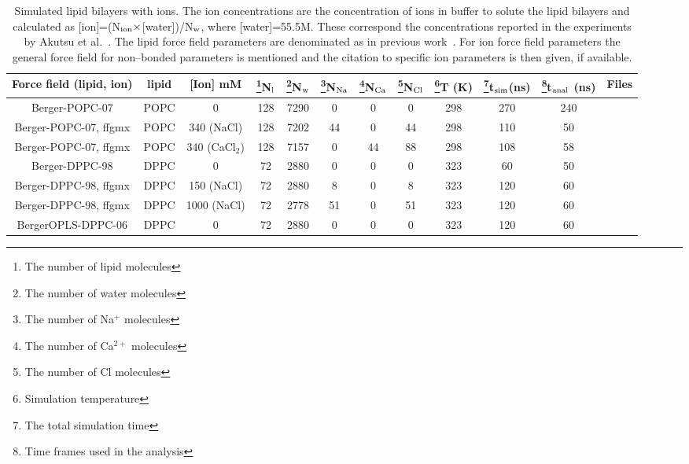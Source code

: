 \documentclass[pre,aps,floatfix,authordate1-4,twocolumn]{revtex4-1}
\begin{document}
\begin{table}[htb]
\centering
\caption{Simulated lipid bilayers with ions. The ion concentrations are the concentration of 
  ions in buffer to solute the lipid bilayers and calculated as [ion]=(N$_{\rm ion} \times$[water])/N$_{\rm w}$, 
  where [water]=55.5M. These correspond the concentrations reported in the experiments by Akutsu et al.~\cite{akutsu81}.
  The lipid force field parameters are denominated as in previous work~\cite{botan15}.
  For ion force field parameters the general force field for non--bonded parameters is mentioned and the citation to specific
  ion parameters is then given, if available.}\label{IONsystems}
\begin{tabular}{c c c c c c c c c c c c}
  Force field (lipid, ion)& lipid & [Ion] mM & \footnote{The number of lipid molecules}N$_{\rm l}$   &  \footnote{The number of water molecules}N$_{\rm w}$   & \footnote{The number of Na$^+$ molecules}N$_{\rm Na}$  & \footnote{The number of Ca$^{2+}$ molecules}N$_{\rm Ca}$   &  \footnote{The number of Cl molecules}N$_{\rm Cl}$ & \footnote{Simulation temperature}T (K)  & \footnote{The total simulation time}t$_{{\rm sim}}$(ns) & \footnote{Time frames used in the analysis}t$_{{\rm anal}}$ (ns) & Files\\
  \hline
  Berger-POPC-07\cite{ollila07a}   &   POPC & 0          & 128 & 7290 & 0  & 0  & 0 & 298  & 270 & 240 & \cite{bergerFILESpopc}  \\
  Berger-POPC-07\cite{ollila07a}, ffgmx\cite{straatsma88}  &   POPC & 340 (NaCl) & 128 & 7202 & 44  & 0  & 44 &298  & 110 & 50 & \cite{bergerPOPC340mMNaClfiles} \\
  Berger-POPC-07\cite{ollila07a}, ffgmx\cite{straatsma88}  &   POPC & 340 (CaCl$_2$) & 128 & 7157 & 0 & 44  & 88 &298 & 108 & 58 &\cite{bergerPOPC340mMCaClfiles}  \\
  \hline
  Berger-DPPC-98\cite{marrink98}   &   DPPC & 0 & 72 & 2880 & 0  & 0  & 0 &323  & 60 & 50 &\cite{bergerDPPCfiles} \\
  Berger-DPPC-98\cite{marrink98}, ffgmx\cite{straatsma88}   &   DPPC & 150 (NaCl) & 72 & 2880 & 8  & 0  & 8 &323  & 120 & 60 &\cite{bergerDPPC150mMfiles} \\
  Berger-DPPC-98\cite{marrink98}, ffgmx\cite{straatsma88}   &   DPPC & 1000 (NaCl) & 72 & 2778 & 51  & 0  & 51 &323  & 120 & 60 &\cite{bergerDPPC1000mMfiles} \\
  \hline
  BergerOPLS-DPPC-06\cite{tieleman06} &   DPPC & 0 & 72 & 2880 & 0  & 0  & 0 &323  & 120 & 60 &\cite{bergerOPLSDPPCfiles} \\

\end{tabular}
\end{table}
\end{document}

